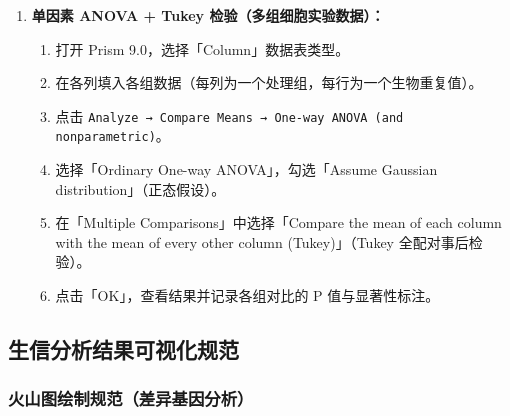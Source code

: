 \documentclass[12pt,a4paper,twoside]{article}
\newcommand{\clickpath}[1]{\texttt{#1}}
\begin{document}
\begin{enumerate}
  \item \textbf{单因素 ANOVA + Tukey 检验（多组细胞实验数据）：}
    \begin{enumerate}
      \item 打开 Prism 9.0，选择「Column」数据表类型。
      \item 在各列填入各组数据（每列为一个处理组，每行为一个生物重复值）。
      \item 点击 \clickpath{Analyze → Compare Means → One-way ANOVA (and nonparametric)}。
      \item 选择「Ordinary One-way ANOVA」，勾选「Assume Gaussian distribution」（正态假设）。
      \item 在「Multiple Comparisons」中选择「Compare the mean of each column with the mean of every other column (Tukey)」（Tukey 全配对事后检验）。
      \item 点击「OK」，查看结果并记录各组对比的 P 值与显著性标注。
    \end{enumerate}
\end{enumerate}

\subsection{生信分析结果可视化规范}
\label{sec:module7_vis}

\subsubsection{火山图绘制规范（差异基因分析）}
\end{document}
